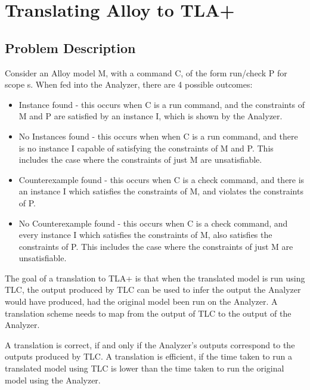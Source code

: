 \chapter{Translating Alloy to TLA+}

\section{Problem Description}

Consider an Alloy model M, with a command C, of the form run/check P for scope s. When fed into the Analyzer, there are 4 possible outcomes:

\begin{itemize}
  \item Instance found - this occurs when C is a run command, and the constraints of M and P are satisfied by an instance I, which is shown by the Analyzer.
  \item No Instances found - this occurs when when C is a run command, and there is no instance I capable of satisfying the constraints of M and P. This includes the case where the constraints of just M are unsatisfiable. 
  \item Counterexample found - this occurs when C is a check command, and there is an instance I which satisfies the constraints of M, and violates the constraints of P.
  \item No Counterexample found - this occurs when C is a check command, and every instance I which satisfies the constraints of M, also satisfies the constraints of P. This includes the case where the constraints of just M are unsatisfiable. 
\end{itemize}

The goal of a translation to TLA+ is that when the translated model is run using TLC, the output produced by TLC can be used to infer the output the Analyzer would have produced, had the original model been run on the Analyzer. A translation scheme needs to map from the output of TLC to the output of the Analyzer.


A translation is correct, if and only if the Analyzer's outputs correspond to the outputs produced by TLC. A translation is efficient, if the time taken to run a translated model using TLC is lower than the time taken to run the original model using the Analyzer.

